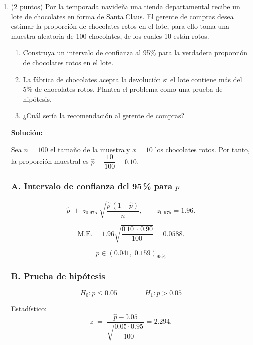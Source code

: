 \documentclass[12pt]{article}
\begin{document}
\begin{enumerate}
	\item (2 puntos) Por la temporada navideña una tienda departamental recibe un lote de chocolates en forma de Santa Claus. El gerente de compras desea estimar la proporción de chocolates rotos en el lote, para ello toma una muestra aleatoria de 100 chocolates, de los cuales 10 están rotos.

	      \begin{enumerate}
		      \item Construya un intervalo de confianza al 95\% para la verdadera proporción de
		            chocolates rotos en el lote.
		      \item La fábrica de chocolates acepta la devolución si el lote contiene más del 5\%
		            de chocolates rotos. Plantea el problema como una prueba de hipótesis.
		      \item ¿Cuál sería la recomendación al gerente de compras?
	      \end{enumerate}

	      \begingroup\color{blue}
	      \textbf{Solución:}

	      Sea \(n = 100\) el tamaño de la muestra y \(x = 10\) los chocolates rotos.
	      Por tanto, la proporción muestral es  \(\hat{p} = \dfrac{10}{100} = 0.10.\)

	      \subsubsection*{A. Intervalo de confianza del 95\,\% para \(p\)}

	      \[
		      \hat{p} \;\pm\; z_{0.975}\;
		      \sqrt{\frac{\hat{p}\,(1-\hat{p})}{n}},
		      \qquad z_{0.975}=1.96.
	      \]

	      \[
		      \text{M.E.}= 1.96
		      \sqrt{\frac{0.10\,\cdot\,0.90}{100}}
		      = 0.0588.
	      \]

	      \[
		      \boxed{p \in (0.041,\; 0.159)}_{95\%}
	      \]

	      \subsubsection*{B. Prueba de hipótesis}

	      \[
		      H_0 : p \le 0.05
		      \qquad\qquad
		      H_1 : p > 0.05
	      \]

	      Estadístico:
	      \[
		      z \;=\;
		      \frac{\hat{p}-0.05}{
			      \sqrt{\dfrac{0.05\cdot0.95}{100}}}
		      = 2.294.
	      \]


\end{enumerate}
\end{document}
